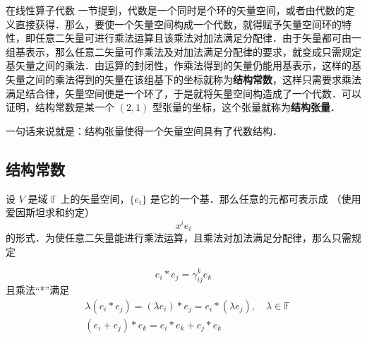 在线性算子代数 一节提到，代数是一个同时是个环的矢量空间，或者由代数的定义直接获得．那么，要使一个矢量空间构成一个代数，就得赋予矢量空间环的特性，即任意二矢量可进行乘法运算且该乘法对加法满足分配律．由于矢量都可由一组基表示，那么任意二矢量可作乘法及对加法满足分配律的要求，就变成只需规定基矢量之间的乘法．由运算的封闭性，作乘法得到的矢量仍能用基表示，这样的基矢量之间的乘法得到的矢量在该组基下的坐标就称为\textbf{结构常数}，这样只需要求乘法满足结合律，矢量空间便是一个环了，于是就将矢量空间构造成了一个代数．可以证明，结构常数是某一个 $(2,1)$ 型张量的坐标，这个张量就称为\textbf{结构张量}． 

一句话来说就是：结构张量使得一个矢量空间具有了代数结构．

\subsection{结构常数}
设 $V$ 是域 $\mathbb F$ 上的矢量空间，$\{e_i\}$ 是它的一个基．那么任意的元都可表示成 （使用爱因斯坦求和约定）
\begin{equation}
x^i e_i
\end{equation}
的形式．为使任意二矢量能进行乘法运算，且乘法对加法满足分配律，那么只需规定

\begin{equation}
e_i*e_j=\gamma_{ij}^k e_k
\end{equation}
且乘法“*”满足
\begin{equation}
\begin{aligned}
&\lambda(e_i*e_j)=(\lambda e_i)*e_j=e_i*(\lambda e_j),\quad \lambda\in\mathbb F\\
&(e_i+e_j)*e_k=e_i*e_k+e_j*e_k
\end{aligned}
\end{equation}
